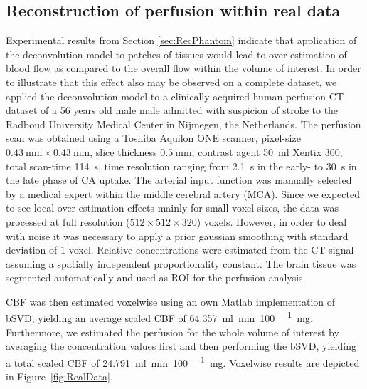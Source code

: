 \documentclass[journal,twocolumn]{IEEEtran}
\begin{document}
	
	\subsection{Reconstruction of perfusion within real data}\label{sec:RealData}
 	Experimental results from Section \ref{sec:RecPhantom} indicate that application of the deconvolution model to patches of tissues would lead to over estimation of blood flow as compared to the overall flow within the volume of interest.
	In order to illustrate that this effect also may be observed on a complete dataset, we applied the deconvolution model to a clinically acquired human perfusion CT dataset of a 56 years old male male admitted with suspicion of stroke to the Radboud University Medical Center in Nijmegen, the Netherlands.
	The perfusion scan was obtained using a Toshiba Aquilon ONE scanner, pixel-size $\SI{0.43}{\milli\meter}\times\SI{0.43}{\milli\meter}$, slice thickness $\SI{0.5}{\milli\meter}$, contrast agent \SI{50}{\milli\litre} Xentix 300, total scan-time \SI{114}{\second}, time resolution ranging from \SI{2.1}{\second} in the early- to \SI{30}{\second} in the late phase of CA uptake.
	The arterial input function was manually selected by a medical expert within the middle cerebral artery (MCA).
	Since we expected to see local over estimation effects mainly for small voxel sizes, the data was processed at full resolution ($512\times512\times320$) voxels. 
	However, in order to deal with noise it was necessary to apply a prior gaussian smoothing with standard deviation of $1$ voxel.	
	Relative concentrations were estimated from the CT signal assuming a spatially independent proportionality constant. The brain tissue was segmented automatically and used as ROI for the perfusion analysis.

	CBF was then estimated voxelwise using an own Matlab implementation of bSVD, yielding an average scaled CBF of \SI{64.357}{\milli\litre\per\minute\per100\milli\gram}.
	Furthermore, we estimated the perfusion for the whole volume of interest by averaging the concentration values first and then performing the bSVD, yielding a total scaled CBF of \SI{24.791}{\milli\litre\per\minute\per100\milli\gram}.
	Voxelwise results are depicted in Figure~\ref{fig:RealData}.
	
\end{document}
